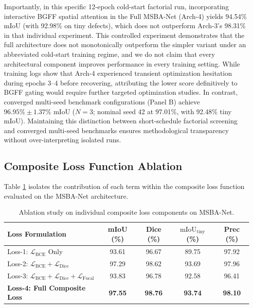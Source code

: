 \documentclass{ieeeaccess}
\begin{document}
Importantly, in this specific 12-epoch cold-start factorial run, incorporating interactive BGFF spatial attention in the Full MSBA-Net (Arch-4) yields 94.54\% mIoU (with 92.98\% on tiny defects), which does not outperform Arch-3's 98.31\% in that individual experiment. This controlled experiment demonstrates that the full architecture does not monotonically outperform the simpler variant under an abbreviated cold-start training regime, and we do not claim that every architectural component improves performance in every training setting. While training logs show that Arch-4 experienced transient optimization hesitation during epochs 3--4 before recovering, attributing the lower score definitively to BGFF gating would require further targeted optimization studies. In contrast, converged multi-seed benchmark configurations (Panel B) achieve $96.95\% \pm 1.37\%$ mIoU ($N=3$; nominal seed 42 at 97.01\%, with 92.48\% tiny mIoU). Maintaining this distinction between short-schedule factorial screening and converged multi-seed benchmarks ensures methodological transparency without over-interpreting isolated runs.

\subsection{Composite Loss Function Ablation}
Table \ref{tab:loss_ablation} isolates the contribution of each term within the composite loss function evaluated on the MSBA-Net architecture.

\begin{table}[!t]
\centering
\setlength{\tabcolsep}{1.8pt}
\fontsize{6.8pt}{8.8pt}\selectfont
\caption{Ablation study on individual composite loss components on MSBA-Net.}
\label{tab:loss_ablation}
\begin{tabular*}{\columnwidth}{@{\extracolsep{\fill}}lcccc@{}}
\toprule
\textbf{Loss Formulation} & \textbf{mIoU (\%)} & \textbf{Dice (\%)} & $\text{mIoU}_{\text{tiny}}$ \textbf{(\%)} & \textbf{Prec (\%)} \\
\midrule
Loss-1: $\mathcal{L}_{\text{BCE}}$ Only & 93.61 & 96.67 & 89.75 & 97.92 \\
Loss-2: $\mathcal{L}_{\text{BCE}} + \mathcal{L}_{\text{Dice}}$ & 97.29 & 98.62 & 93.69 & 97.96 \\
Loss-3: $\mathcal{L}_{\text{BCE}} + \mathcal{L}_{\text{Dice}} + \mathcal{L}_{\text{Focal}}$ & 93.83 & 96.78 & 92.58 & 96.41 \\
\textbf{Loss-4: Full Composite Loss} & \textbf{97.55} & \textbf{98.76} & \textbf{93.74} & \textbf{98.10} \\
\bottomrule
\end{tabular*}
\end{table}
\end{document}
